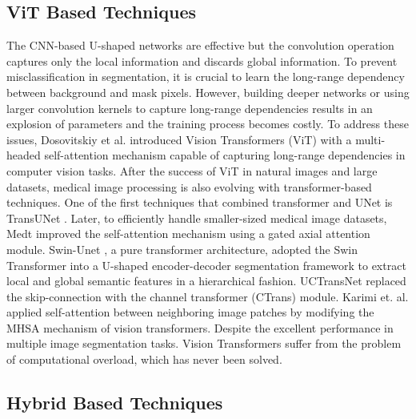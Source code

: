 \documentclass{article}
\begin{document}
\subsection{ViT Based Techniques}\label{ViT Based Techniques}

The CNN-based U-shaped networks are effective but the convolution operation captures only the local information and discards global information. To prevent misclassification in segmentation, it is crucial to learn the long-range dependency between background and mask pixels. However, building deeper networks or using larger convolution kernels to capture long-range dependencies results in an explosion of parameters and the training process becomes costly. To address these issues, Dosovitskiy et al. \cite{dosovitskiy2021an} introduced Vision Transformers (ViT) with a multi-headed self-attention mechanism capable of capturing long-range dependencies in computer vision tasks. After the success of ViT in natural images and large datasets, medical image processing is also evolving with transformer-based techniques. One of the first techniques that combined transformer and UNet is TransUNet \cite{chen2021transunet}. Later, to efficiently handle smaller-sized medical image datasets, Medt \cite{valanarasu2021medical} improved the self-attention mechanism using a gated axial attention module. Swin-Unet \cite{cao2022swin}, a pure transformer architecture, adopted the Swin Transformer into a U-shaped encoder-decoder segmentation framework to extract local and global semantic features in a hierarchical fashion. UCTransNet \cite{wang2022uctransnet} replaced the skip-connection with the channel transformer (CTrans) module. Karimi et. al. \cite{karimi2021convolution} applied self-attention between neighboring image patches by modifying the MHSA mechanism of vision transformers. Despite the excellent performance in multiple image segmentation tasks. Vision Transformers suffer from the problem of computational overload, which has never been solved.

\subsection{Hybrid Based Techniques}\label{Hybrid Based Techniques}
\end{document}
